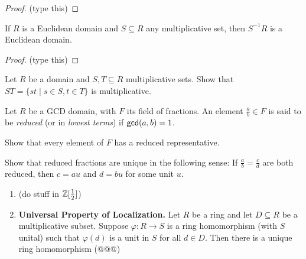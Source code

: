 \begin{proof}
(type this)
\end{proof}

\begin{prop}
If \(R\) is a Euclidean domain and \(S \subseteq R\) any multiplicative set, then \(S^{-1}R\) is a Euclidean domain.
\end{prop}

\begin{proof}
(type this)
\end{proof}

\Exercises%

\begin{exercise}
Let \(R\) be a domain and \(S,T \subseteq R\) multiplicative sets. Show that \(ST = \{ st \mid s \in S, t \in T \}\) is multiplicative.
\end{exercise}

\begin{exercise}
Let \(R\) be a GCD domain, with \(F\) its field of fractions. An element \(\frac{a}{b} \in F\) is said to be \emph{reduced} (or in \emph{lowest terms}) if \(\mathsf{gcd}(a, b) = 1\).
\begin{proplist}
\item Show that every element of \(F\) has a reduced representative.
\item Show that reduced fractions are unique in the following sense: If \(\frac{a}{b} = \frac{c}{d}\) are both reduced, then \(c = au\) and \(d = bu\) for some unit \(u\).
\end{proplist}
\end{exercise}

\begin{enumerate}
\item (do stuff in \(\mathbb{Z}[\frac{1}{2}]\))

\item \textbf{Universal Property of Localization.} Let \(R\) be a ring and let \(D \subseteq R\) be a multiplicative subset. Suppose \(\varphi : R \rightarrow S\) is a ring homomorphism (with \(S\) unital) such that \(\varphi(d)\) is a unit in \(S\) for all \(d \in D\). Then there is a unique ring homomorphism (@@@)
\end{enumerate}
